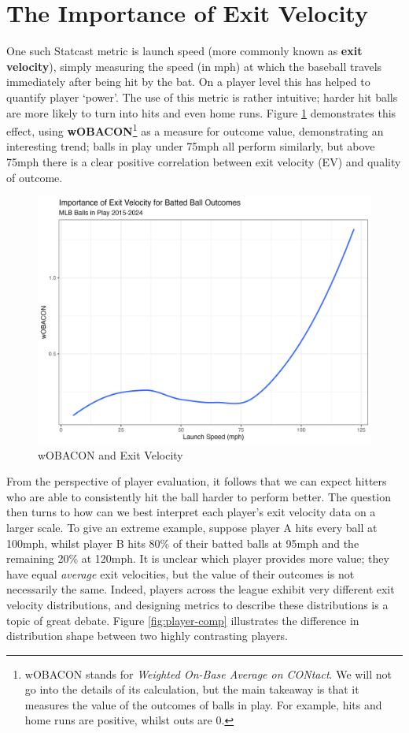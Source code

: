 \documentclass[12pt, TexShade, letterpaper]{report}
\begin{document}
\section{The Importance of Exit Velocity}
One such Statcast metric is launch speed (more commonly known as \textbf{exit velocity}), simply measuring the speed (in mph) at which the baseball travels immediately after being hit by the bat. On a player level this has helped to quantify player `power'. The use of this metric is rather intuitive; harder hit balls are more likely to turn into hits and even home runs. Figure \ref{fig:woba-ev} demonstrates this effect, using \textbf{wOBACON}\footnote{wOBACON stands for \textit{Weighted On-Base Average on CONtact}. We will not go into the details of its calculation, but the main takeaway is that it measures the value of the outcomes of balls in play. For example, hits and home runs are positive, whilst outs are 0.} as a measure for outcome value, demonstrating an interesting trend; balls in play under 75mph all perform similarly, but above 75mph there is a clear positive correlation between exit velocity (EV) and quality of outcome.

\begin{figure}[h]
    \centering
    \includegraphics[width=0.75\linewidth]{plots/ev_woba.png}
    \caption{wOBACON and Exit Velocity}
    \label{fig:woba-ev}
\end{figure}

From the perspective of player evaluation, it follows that we can expect hitters who are able to consistently hit the ball harder to perform better. The question then turns to how can we best interpret each player's exit velocity data on a larger scale. To give an extreme example, suppose player A hits every ball at 100mph, whilst player B hits 80\% of their batted balls at 95mph and the remaining 20\% at 120mph. It is unclear which player provides more value; they have equal \textit{average} exit velocities, but the value of their outcomes is not necessarily the same. Indeed, players across the league exhibit very different exit velocity distributions, and designing metrics to describe these distributions is a topic of great debate. Figure \ref{fig:player-comp} illustrates the difference in distribution shape between two highly contrasting players.
\end{document}

